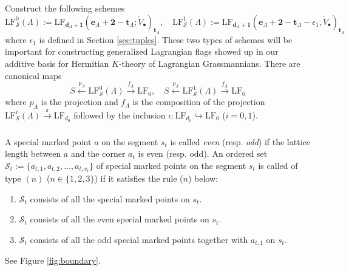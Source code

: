 \documentclass[a4paper]{amsart}
\theoremstyle{plain}
\theoremstyle{definition}
\numberwithin{equation}{section}
\newcommand{\LF}{\mathrm{LF}}
\begin{document}
\subsubsection{ } Construct the following schemes
\[\LF_{\mathcal{S}}^0{(\Lambda)} := \LF_{\mathbf{{d}}_{\Lambda}+\mathbf{1}}(\mathbf{e}_{\Lambda}+\mathbf{2}- \mathbf{t}_{\Lambda};\mathring{V}_\bullet)_{\mathbf{t}_{\Lambda}}, \quad
    \LF_{\mathcal{S}}^1(\Lambda) := \LF_{\mathbf{d}_{\Lambda}+\mathbf{1}}(\mathbf{e}_{\Lambda}+\mathbf{2}- \mathbf{t}_{\Lambda} - \epsilon_1, \mathring{V}_\bullet)_{\mathbf{t}_{\Lambda}} \]
where $\epsilon_1$ is defined in Section \ref{sec:tuples}.
These two types of schemes will be important for constructing generalized Lagrangian flags showed up in our additive basis for Hermitian $K$-theory of Lagrangian Grassmannians. There are canonical maps
\[  S \stackrel{p_\Lambda}\longleftarrow \LF^0_{\mathcal{S}}{(\Lambda)} \stackrel{f_\Lambda}\longrightarrow \LF_0, \quad S \stackrel{p_\Lambda}\longleftarrow \LF^1_{\mathcal{S}}{(\Lambda)} \stackrel{f_\Lambda}\longrightarrow \LF_0\]
where $p_\Lambda$ is the projection and $f_\Lambda$ is the composition of the projection $\LF^i_{\mathcal{S}}{(\Lambda)} \xrightarrow{\pi}  \LF_{d_0} $ followed by the inclusion $ \iota: \LF_{d_0} \hookrightarrow \LF_0 $ ($i =0,1$).


\subsubsection{}
A special marked point $a$ on the segment $s_t$ is called \textit{even} (resp. \textit{odd}) if the lattice length between $a$ and the corner $a_t$ is even (resp. odd).
An ordered set $\mathcal{S}_t:=\{a_{t,1}, a_{t,2}, \ldots, a_{t,v_t}\}$ of special marked points on the segment $s_t$ is called of type $(n)$ ($n \in \{1,2,3\}$) if it satisfies the rule ($n$) below:
\begin{enumerate}
    \item [(1)] $\mathcal{S}_t$ consists of all the special marked points on $s_t$.
    \item [(2)] $\mathcal{S}_t$ consists of all the even special marked points on $s_t$.
    \item [(3)] $\mathcal{S}_t$ consists of all the odd special marked points together with $a_{t,1}$ on $s_t$.
\end{enumerate}
See Figure \ref{fig:boundary}.
\end{document}
